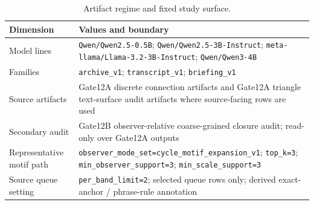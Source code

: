 \documentclass[11pt]{article}
\newcommand{\breakcode}[1]{\begingroup\urlstyle{tt}\nolinkurl{#1}\endgroup}
\begin{document}
\begin{table}[ht]
\centering
\small
\caption{Artifact regime and fixed study surface.}
\label{tab:artifact-regime}
\begin{tabular}{|>{\raggedright\arraybackslash}p{}|>{\raggedright\arraybackslash}p{}|}
\hline
Dimension & Values and boundary \\
\hline
Model lines & \breakcode{Qwen/Qwen2.5-0.5B}; \breakcode{Qwen/Qwen2.5-3B-Instruct}; \breakcode{meta-llama/Llama-3.2-3B-Instruct}; \breakcode{Qwen/Qwen3-4B} \\
\hline
Families & \breakcode{archive_v1}; \breakcode{transcript_v1}; \breakcode{briefing_v1} \\
\hline
Source artifacts & Gate12A discrete connection artifacts and Gate12A triangle text-surface audit artifacts where source-facing rows are used \\
\hline
Secondary audit & Gate12B observer-relative coarse-grained closure audit; read-only over Gate12A outputs \\
\hline
Representative motif path & \breakcode{observer_mode_set=cycle_motif_expansion_v1}; \breakcode{top_k=3}; \breakcode{min_observer_support=3}; \breakcode{min_scale_support=3} \\
\hline
Source queue setting & \breakcode{per_band_limit=2}; selected queue rows only; derived exact-anchor / phrase-rule annotation \\
\hline
\end{tabular}
\end{table}
\end{document}
